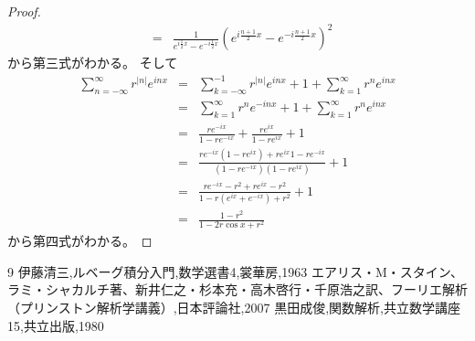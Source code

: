 \documentclass[leqno]{jsarticle}
\newcommand{\mgn}{\infty}
\newcommand{\bmb}{e^{i\frac{1}{2}x}-e^{-i\frac{1}{2}x}}
\begin{document}
\begin{proof}
\begin{eqnarray*}
&=&\frac{1}{\bmb}\left(   e^{i\frac{n+1}{2}x}-e^{-i\frac{n+1}{2}x}      \right)^2
\end{eqnarray*}
から第三式がわかる。
そして
\begin{eqnarray*}
\sum_{n=-\mgn}^{\mgn}r^{|n|}e^{inx}&=&
\sum_{k=-\mgn}^{-1}r^{|n|}e^{inx}+1+\sum_{k=1}^{\mgn}r^{n}e^{inx}\\ 
&=&\sum_{k=1}^{\mgn}r^{n}e^{-inx}+1+\sum_{k=1}^{\mgn}r^{n}e^{inx}\\ 
&=&\frac{re^{-ix}}{1-re^{-ix}}+\frac{re^{ix}}{1-re^{ix}}+1\\ 
&=&\frac{re^{-ix}(1-re^{ix})+re^{ix}1-re^{-ix}}{(1-re^{-ix})(1-re^{ix})}+1\\ 
&=&\frac{re^{-ix}-r^2+re^{ix}-r^2}{1-r(e^{ix}+e^{-ix})+r^2}+1\\ 
&=&\frac{1-r^2}{1-2r\cos x+r^2}
\end{eqnarray*}から第四式がわかる。
\end{proof}



\begin{thebibliography}{9}
伊藤清三,ルベーグ積分入門,数学選書4,裳華房,1963
エアリス・M・スタイン、ラミ・シャカルチ著、新井仁之・杉本充・高木啓行・千原浩之訳、フーリエ解析（プリンストン解析学講義）,日本評論社,2007
黒田成俊,関数解析,共立数学講座15,共立出版,1980
\end{thebibliography}
\end{document}
